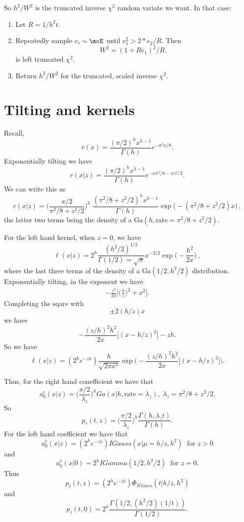 \documentclass[12pt]{article}
\begin{document}
So $h^2 / W^2$ is the truncated inverse $\chi^2$ random variate we want.  In
that case:
\begin{enumerate}

\item Let $R = 1/h^2 t$.  

\item Repeatedly sample $e_i \sim \mcE$ until $e_1^2 > 2 * e_2 / R$.  Then
  \[
  W^2 = (1+R e_1)^2 / R.
  \]
  is left truncated $\chi^2$.

\item Return $h^2 / W^2$ for the truncated, scaled inverse $\chi^2$.
\end{enumerate}

\section{Tilting and kernels}

Recall,
\[
r(x) = \frac{(\pi/2)^h x^{h-1}}{\Gamma(h)} e^{-\pi^2 x / 8}.
\]
Exponentially tilting we have
\[
r(x|z) = \frac{(\pi/2)^h x^{h-1}}{\Gamma(h)} e^{- x\pi^2 / 8 - x z^2 / 2}.
\]
We can write this as
\[
r(x|z) = \Big(\frac{\pi/2}{\pi^2/8 + z^2 / 2}\Big)^{h} \; \frac{(\pi^2/8 + z^2 / 2)^h
  x^{h-1}}{\Gamma(h)} \exp \Big( - (\pi^2/8 + z^2 / 2) x \Big) \, ,
\]
the latter two terms being the density of a $\mbox{Ga}(h,
\mbox{rate}=\pi^2/8+z^2/2)$.

For the left hand kernel, when $z=0$, we have
\[
\ell(x|z) = 2^h \frac{(h^2/2)^{1/2}}{\Gamma(1/2)=\sqrt{\pi}} x^{-3/2} \exp
\Big( - \frac{h^2}{2x} \Big) \, ,
\]
where the last three terms of the density of a $\mbox{Ga}(1/2, h^2/2)$
distribution.  Exponentially tilting, in the exponent we have
\begin{align*}
-\frac{z^2}{2x} \Big[ \big( \frac{h}{z} \big)^2 + x^2 \Big] .
\end{align*}
Completing the sqare with 
\[
\pm 2 (h / z) x
\]
we have
\[
- \frac{(z/h)^2 h^2}{2x} \Big[ (x - h / z)^2 \Big] - z h.
\]
So we have
\[
\ell(x|z) = (2^h e^{-z h} ) \frac{h}{\sqrt{2 \pi x^3}} \exp \Big( -
\frac{(z/h)^2 h^2}{2x} \Big[ (x - h / z)^2 \Big] \Big).
\]

Thus, for the right hand conefficient we have that
\[
a_0^r(x|z) = \Big( \frac{\pi/2}{\lambda_z} \Big)^h Ga(x | h, \mbox{rate}=\lambda_z), \;
\lambda_z = \pi^2/8 + z^2/2.
\]
So
\[
p_r(t,z) = \Big(\frac{\pi/2}{\lambda_z}\Big)^{h} \frac{\Gamma(h, \lambda_z t)}{\Gamma(h)}.
\]
For the left hand coefficient we have that
\[
a_0^\ell(x|z) = (2^h e^{-zh}) IGauss(x|\mu = h/z, h^2) \; \text{ for } z > 0
\]
and
\[
a_0^\ell(x|0) = 2^h IGamma(1/2, h^2/2) \; \text{ for } z = 0.
\]
Thus
\[
p_\ell(t,z) = (2^h e^{-zh}) \Phi_{IGauss}(t | h/z, h^2)
\]
and
\[
p_\ell(t,0) = 2^h \frac{\Gamma(1/2, (h^2/2) (1/t))}{\Gamma(1/2)}.
\]
\end{document}
